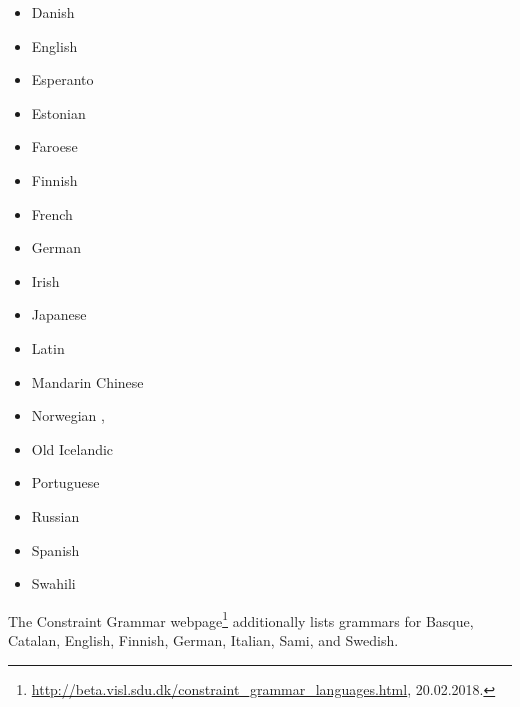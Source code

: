 \begin{itemize}
\item Danish       \citep{Bick2001a-u,BN2007a-u}
\item English     \citep{MIF85a,SN86a,LR87a,Hudson89a,ST91a-u,VHA92a-u,IKKLP92a-u,Coch96a}
\item Esperanto \citep{Bick2009a-u} 
\item Estonian   \citep*{Mueuerisep99a-u,MPMKRU2003a-u}
\item Faroese     \citep{Trosterud2009a-u}
\item Finnish     \citep*{NJL84a-u,JLV86a-u}
\item French       \citep{IKKLP92a-u,Coch96a,Bick2010a-u}
\item German       \citep{Hellwig86a-u,Coch96a,HKMS98a-u,MS98c-u,Hellwig2003a,Hellwig2006a,GK2001a}
\item Irish         \citep{DvG2006a-u}
\item Japanese   \citep*{MIF85a}
\item Latin         \citep{Covington90a}
\item Mandarin Chinese \citep{LW2006a-u,Liu2009a-u}
\item Norwegian               \citep*{HBN2000a-u},
\item Old Icelandic       \citep{Maas77a}
\item Portuguese             \citep{Bick2003a-u} 
\item Russian                   \citep{HZ60a-u,Melcuk64a-u,Covington90a}
\item Spanish                   \citep{Coch96a,Bick2006a-u}
\item Swahili                   \citep{Hurskainen2006a-u}
\end{itemize}
The Constraint Grammar webpage\footnote{
  \url{http://beta.visl.sdu.dk/constraint_grammar_languages.html}, 20.02.2018.
} additionally lists grammars for
Basque,
Catalan,
English,
Finnish,
German,
Italian,
Sami, and
Swedish.
%
